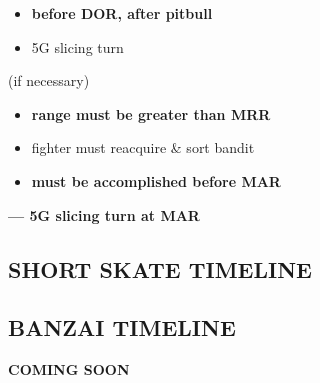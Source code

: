 \begin{checklistenumerate}[start=0]
    \blueitem[Out]
    \label{subsec:ttpaa:timeline:skate:out}
    \begin{itemize}
        \item \textbf{before DOR, after pitbull}
        \item 5G slicing turn
    \end{itemize}
    \blueitem[Recommit] (if necessary)
    \label{subsec:ttpaa:timeline:skate:recommit}
    \begin{itemize}
        \item \textbf{range must be greater than MRR}
        \item fighter must reacquire \& sort bandit
    \end{itemize}
    \blueitem[Employment]
    \label{subsec:ttpaa:timeline:skate:shoot2}
    \begin{itemize}
        \item \textbf{must be accomplished before MAR}
    \end{itemize}
    \blueitem[Out]%
    \label{subsec:ttpaa:timeline:skate:out2}
    \textbf{--- 5G slicing turn at MAR}
\end{checklistenumerate}

\clearpage

\subsection{SHORT SKATE TIMELINE}
\subsection{BANZAI TIMELINE}

\begin{center}
    \vspace{\textheight/4}
    \Large\titlefont\textbf{COMING SOON}
\end{center}

\marginfigrestore